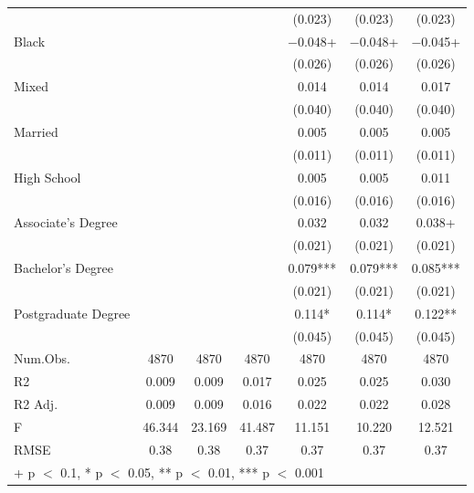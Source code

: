 \documentclass[
]{article}
\begin{document}
\begin{table}
{\begin{tabular}[t]{lcccccc}
 &  &  &  & (\num{0.023}) & (\num{0.023}) & (\num{0.023})\\
Black &  &  &  & \num{-0.048}+ & \num{-0.048}+ & \num{-0.045}+\\
 &  &  &  & (\num{0.026}) & (\num{0.026}) & (\num{0.026})\\
Mixed &  &  &  & \num{0.014} & \num{0.014} & \num{0.017}\\
 &  &  &  & (\num{0.040}) & (\num{0.040}) & (\num{0.040})\\
Married &  &  &  & \num{0.005} & \num{0.005} & \num{0.005}\\
 &  &  &  & (\num{0.011}) & (\num{0.011}) & (\num{0.011})\\
High
School &  &  &  & \num{0.005} & \num{0.005} & \num{0.011}\\
 &  &  &  & (\num{0.016}) & (\num{0.016}) & (\num{0.016})\\
Associate's
Degree &  &  &  & \num{0.032} & \num{0.032} & \num{0.038}+\\
 &  &  &  & (\num{0.021}) & (\num{0.021}) & \vphantom{1} (\num{0.021})\\
Bachelor's
Degree &  &  &  & \num{0.079}*** & \num{0.079}*** & \num{0.085}***\\
 &  &  &  & (\num{0.021}) & (\num{0.021}) & (\num{0.021})\\
Postgraduate
Degree &  &  &  & \num{0.114}* & \num{0.114}* & \num{0.122}**\\
 &  &  &  & (\num{0.045}) & (\num{0.045}) & (\num{0.045})\\
\midrule
Num.Obs. & \num{4870} & \num{4870} & \num{4870} & \num{4870} & \num{4870} & \num{4870}\\
R2 & \num{0.009} & \num{0.009} & \num{0.017} & \num{0.025} & \num{0.025} & \num{0.030}\\
R2 Adj. & \num{0.009} & \num{0.009} & \num{0.016} & \num{0.022} & \num{0.022} & \num{0.028}\\
F & \num{46.344} & \num{23.169} & \num{41.487} & \num{11.151} & \num{10.220} & \num{12.521}\\
RMSE & \num{0.38} & \num{0.38} & \num{0.37} & \num{0.37} & \num{0.37} & \num{0.37}\\
\bottomrule
\multicolumn{7}{l}{\rule{0pt}{1em}+ p $<$ 0.1, * p $<$ 0.05, ** p $<$ 0.01, *** p $<$ 0.001}\\
\end{tabular}}
\end{table}
\end{document}
